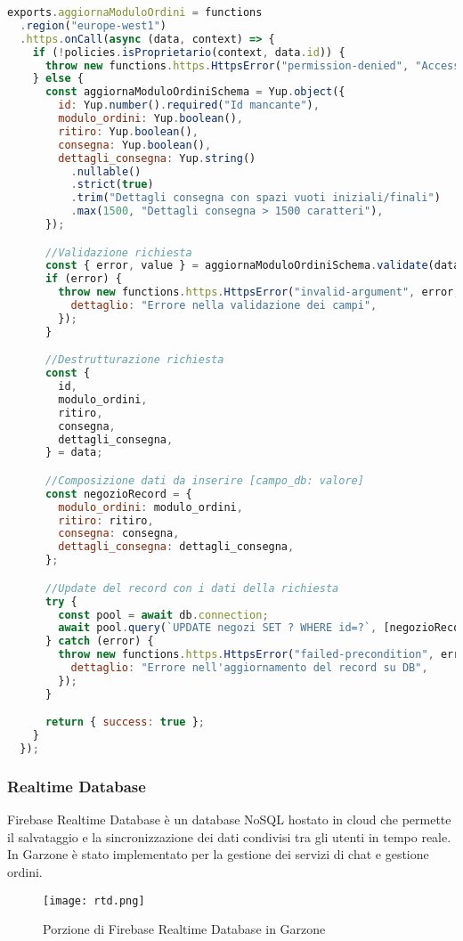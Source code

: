 \begin{lstlisting}[language=JavaScript]
    exports.aggiornaModuloOrdini = functions
  .region("europe-west1")
  .https.onCall(async (data, context) => {
    if (!policies.isProprietario(context, data.id)) {
      throw new functions.https.HttpsError("permission-denied", "Accesso negato");
    } else {
      const aggiornaModuloOrdiniSchema = Yup.object({
        id: Yup.number().required("Id mancante"),
        modulo_ordini: Yup.boolean(),
        ritiro: Yup.boolean(),
        consegna: Yup.boolean(),
        dettagli_consegna: Yup.string()
          .nullable()
          .strict(true)
          .trim("Dettagli consegna con spazi vuoti iniziali/finali")
          .max(1500, "Dettagli consegna > 1500 caratteri"),
      });

      //Validazione richiesta
      const { error, value } = aggiornaModuloOrdiniSchema.validate(data);
      if (error) {
        throw new functions.https.HttpsError("invalid-argument", error, {
          dettaglio: "Errore nella validazione dei campi",
        });
      }

      //Destrutturazione richiesta
      const {
        id,
        modulo_ordini,
        ritiro,
        consegna,
        dettagli_consegna,
      } = data;

      //Composizione dati da inserire [campo_db: valore]
      const negozioRecord = {
        modulo_ordini: modulo_ordini,
        ritiro: ritiro,
        consegna: consegna,
        dettagli_consegna: dettagli_consegna,
      };

      //Update del record con i dati della richiesta
      try {
        const pool = await db.connection;
        await pool.query(`UPDATE negozi SET ? WHERE id=?`, [negozioRecord, id]);
      } catch (error) {
        throw new functions.https.HttpsError("failed-precondition", error, {
          dettaglio: "Errore nell'aggiornamento del record su DB",
        });
      }

      return { success: true };
    }
  });
\end{lstlisting}
\newpage
\subsubsection{Realtime Database}
Firebase Realtime Database è un database NoSQL hostato in cloud che permette il salvataggio e la sincronizzazione dei dati condivisi tra gli utenti in tempo reale. In Garzone è stato implementato per la gestione dei servizi di chat e gestione ordini. 
\begin{figure}[!htb]
    \centering
    \texttt{[image: rtd.png]}
    \caption{Porzione di Firebase Realtime Database in Garzone}
\end{figure}

